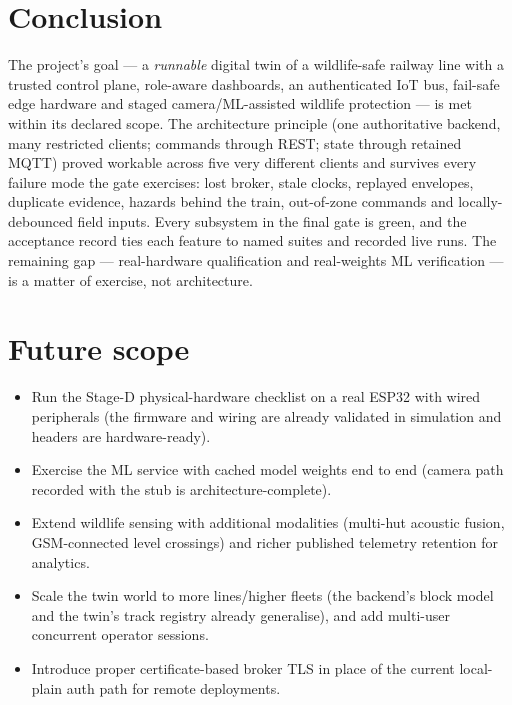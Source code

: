 \section{Conclusion}

The project's goal --- a \emph{runnable} digital twin of a wildlife-safe
railway line with a trusted control plane, role-aware dashboards, an
authenticated IoT bus, fail-safe edge hardware and staged
camera/ML-assisted wildlife protection --- is met within its declared
scope. The architecture principle (one authoritative backend, many
restricted clients; commands through REST; state through retained MQTT)
proved workable across five very different clients and survives every
failure mode the gate exercises: lost broker, stale clocks, replayed
envelopes, duplicate evidence, hazards behind the train, out-of-zone
commands and locally-debounced field inputs. Every subsystem in the
final gate is green, and the acceptance record ties each feature to
named suites and recorded live runs. The remaining gap --- real-hardware
qualification and real-weights ML verification --- is a matter of
exercise, not architecture.

\section{Future scope}

\begin{itemize}
  \item Run the Stage-D physical-hardware checklist on a real ESP32 with
        wired peripherals (the firmware and wiring are already
        validated in simulation and headers are hardware-ready).
  \item Exercise the ML service with cached model weights end to end
        (camera path recorded with the stub is architecture-complete).
  \item Extend wildlife sensing with additional modalities (multi-hut
        acoustic fusion, GSM-connected level crossings) and richer
        published telemetry retention for analytics.
  \item Scale the twin world to more lines/higher fleets (the
        backend's block model and the twin's track registry already
        generalise), and add multi-user concurrent operator sessions.
  \item Introduce proper certificate-based broker TLS in place of the
        current local-plain auth path for remote deployments.
\end{itemize}
